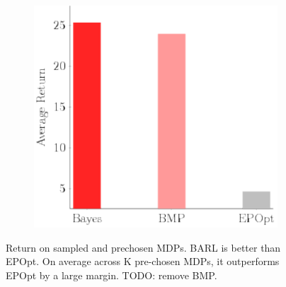 \documentclass{article}
\begin{document}
\begin{figure}[t!]
\begin{centering}
\begin{subfigure}[b]{0.20\columnwidth}
\includegraphics[width=\linewidth]{figs/ant_average.pdf}
\end{subfigure}
\end{centering}
\caption{Return on sampled and prechosen MDPs. BARL is better than EPOpt. On average across K pre-chosen MDPs, it outperforms EPOpt by a large margin. TODO: remove BMP.}
\end{figure}
\end{document}
